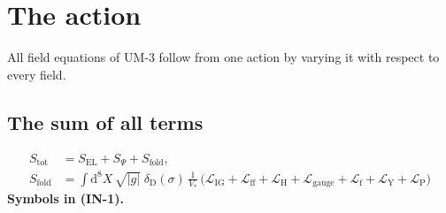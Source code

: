 \documentclass[
  10pt,
]{article}
\begin{document}
\hypertarget{the-action}{%
\section{The action}\label{the-action}}

All field equations of UM-3 follow from one action by varying it with
respect to every field.

\hypertarget{the-sum-of-all-terms}{%
\subsection{The sum of all terms}\label{the-sum-of-all-terms}}

\[
\begin{aligned}
S_{\mathrm{tot}} &= S_{\mathrm{EL}} + S_\Psi + S_{\mathrm{fold}},\\
S_{\mathrm{fold}} &= \int\mathrm{d}^8X\,\sqrt{\lvert g\rvert}\;\delta_{\mathrm{D}}(\sigma)\,\frac{1}{V_*}\,
\big(\mathcal{L}_{\mathrm{IG}} + \mathcal{L}_{\mathrm{ff}} + \mathcal{L}_{\mathrm{H}} + \mathcal{L}_{\mathrm{gauge}}
+ \mathcal{L}_{\mathrm{f}} + \mathcal{L}_{\mathrm{Y}} + \mathcal{L}_{\mathrm{P}}\big)
\end{aligned} \tag{IN-1}
\] \textbf{Symbols in (IN-1).}
\end{document}
